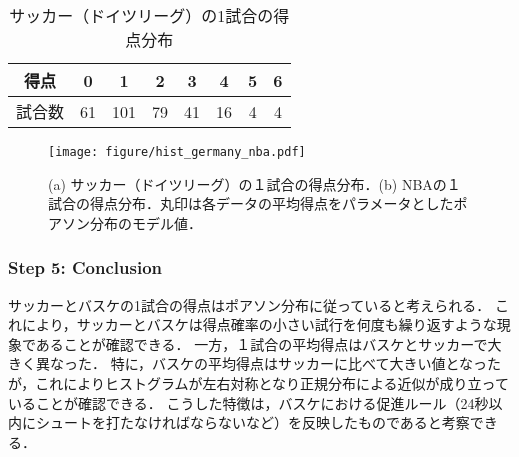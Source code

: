 %
\begin{table}[H]
    \centering
    \caption{サッカー（ドイツリーグ）の1試合の得点分布}
    \label{tb:football}
    \begin{tabular}{c|ccccccc}
    \hline
        得点 & 0 & 1 & 2 & 3 & 4 & 5 & 6 \\ \hline
        試合数 & 61 & 101 & 79 & 41 & 16 & 4 & 4 \\ \hline
    \end{tabular}
\end{table}
%

%
\begin{table}[H]
    \centering
    \caption{NBAの１試合の得点分布}
    \label{tb:basketball}
\end{table}
%

%
\begin{figure}[H]
	\centering
	\texttt{[image: figure/hist\_germany\_nba.pdf]}
	\caption{(a) サッカー（ドイツリーグ）の１試合の得点分布．(b) NBAの１試合の得点分布．丸印は各データの平均得点をパラメータとしたポアソン分布のモデル値．}
	\label{fig:hist_germany_nba}
\end{figure}
%

\subsubsection*{Step 5: Conclusion}
%
サッカーとバスケの1試合の得点はポアソン分布に従っていると考えられる．
%
これにより，サッカーとバスケは得点確率の小さい試行を何度も繰り返すような現象であることが確認できる．
%
一方，１試合の平均得点はバスケとサッカーで大きく異なった．
%
特に，バスケの平均得点はサッカーに比べて大きい値となったが，これによりヒストグラムが左右対称となり正規分布による近似が成り立っていることが確認できる．
%
こうした特徴は，バスケにおける促進ルール（24秒以内にシュートを打たなければならないなど）を反映したものであると考察できる．
%

